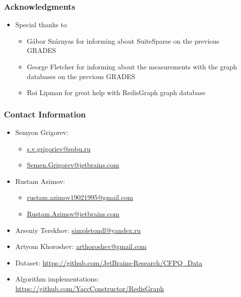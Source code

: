 \documentclass[xcolor=table]{beamer}
\begin{document}
\begin{frame}
\frametitle{Acknowledgments}
\begin{itemize}
	\item Special thanks to
	\begin{itemize}
		\item Gábor Szárnyas for informing about SuiteSparse on the previous GRADES
		\item George Fletcher for informing about the measurements with the graph databases on the previous GRADES
		\item Roi Lipman for great help with RedisGraph graph database
	\end{itemize}
\end{itemize}
\end{frame}

\begin{frame}
\frametitle{Contact Information}
\begin{itemize}
  \item Semyon Grigorev:
    \begin{itemize}
      \item \href{mailto:s.v.grigoriev@spbu.ru}{s.v.grigoriev@spbu.ru}
      \item \href{mailto:Semen.Grigorev@jetbrains.com}{Semen.Grigorev@jetbrains.com}
    \end{itemize}
  \item Rustam Azimov:
  \begin{itemize}
  	\item \href{mailto:rustam.azimov19021995@gmail.com}{rustam.azimov19021995@gmail.com}
  	\item \href{mailto:Rustam.Azimov@jetbrains.com}{Rustam.Azimov@jetbrains.com}
  \end{itemize}
  \item Arseniy Terekhov: \href{mailto:simpletondl@yandex.ru}{simpletondl@yandex.ru}
  \item Artyom Khoroshev: \href{mailto:arthoroshev@gmail.com}{arthoroshev@gmail.com}
\vspace{0.5cm}
  \item Dataset: \href{https://github.com/JetBrains-Research/CFPQ_Data}{https://github.com/JetBrains-Research/CFPQ\_Data}
   \item Algorithm implementations: \href{https://github.com/YaccConstructor/RedisGraph}{https://github.com/YaccConstructor/RedisGraph}
\end{itemize}
\vspace{0.1cm}
\end{frame}
\end{document}
